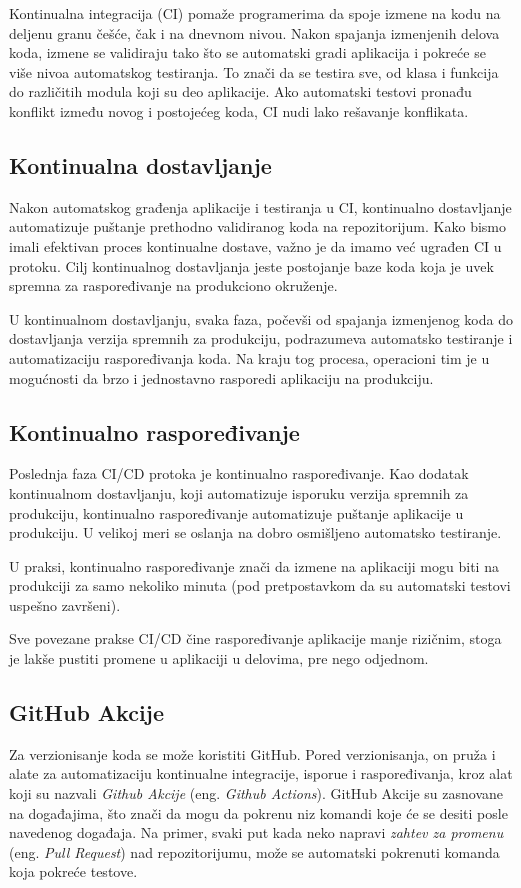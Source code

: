Kontinualna integracija (CI) pomaže programerima da spoje izmene na kodu na deljenu granu češće, 
čak i na dnevnom nivou. Nakon spajanja izmenjenih delova koda, izmene se validiraju tako što se 
automatski gradi aplikacija i pokreće se više nivoa automatskog testiranja. To znači da se testira 
sve, od klasa i funkcija do različitih modula koji su deo aplikacije. Ako automatski testovi pronađu 
konflikt između novog i postojećeg koda, CI nudi lako rešavanje konflikata.

\subsection{Kontinualna dostavljanje}
Nakon automatskog građenja aplikacije i testiranja u CI, kontinualno dostavljanje automatizuje 
puštanje prethodno validiranog koda na repozitorijum. Kako bismo imali efektivan proces kontinualne 
dostave, važno je da imamo već ugrađen CI u protoku. Cilj kontinualnog dostavljanja jeste postojanje 
baze koda koja je uvek spremna za raspoređivanje na produkciono okruženje.

U kontinualnom dostavljanju, svaka faza, počevši od spajanja izmenjenog koda do dostavljanja 
verzija spremnih za produkciju, podrazumeva automatsko testiranje i automatizaciju raspoređivanja 
koda. Na kraju tog procesa, operacioni tim je u mogućnosti da brzo i jednostavno rasporedi 
aplikaciju na produkciju.

\subsection{Kontinualno raspoređivanje}
Poslednja faza CI/CD protoka je kontinualno raspoređivanje. Kao dodatak kontinualnom dostavljanju, 
koji automatizuje isporuku verzija spremnih za produkciju, kontinualno raspoređivanje automatizuje 
puštanje aplikacije u produkciju. U velikoj meri se oslanja na dobro osmišljeno automatsko testiranje.

U praksi, kontinualno raspoređivanje znači da izmene na aplikaciji mogu biti na produkciji za samo 
nekoliko minuta (pod pretpostavkom da su automatski testovi uspešno završeni).

Sve povezane prakse CI/CD čine raspoređivanje aplikacije manje rizičnim, stoga je lakše pustiti 
promene u aplikaciji u delovima, pre nego odjednom.~\cite{CI_CD}

\subsection{GitHub Akcije}
Za verzionisanje koda se može koristiti GitHub. Pored verzionisanja, on pruža i alate za automatizaciju 
kontinualne integracije, isporue i raspoređivanja, kroz alat koji su nazvali \textit{Github Akcije} 
(eng. \textit{Github Actions}). 
GitHub Akcije su zasnovane na događajima, što znači da mogu da pokrenu niz komandi koje će se desiti 
posle navedenog događaja. Na primer, svaki put kada neko napravi \textit{zahtev za promenu} 
(eng. \textit{Pull Request}) nad repozitorijumu, može se automatski pokrenuti komanda koja pokreće 
testove. 

